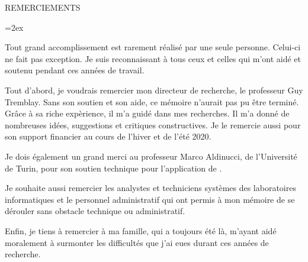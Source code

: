 
   \parskip=0pt
   \vspace*{0.1 truecm} 
   \begin{center}
    {\uppercase { REMERCIEMENTS }}\par
   \end{center}
   \nobreak \vspace*{1.10 truecm}
   \parskip=2ex




Tout grand accomplissement est rarement r\'ealis\'e par une seule personne. Celui-ci ne fait pas exception. Je suis reconnaissant \`a tous ceux et celles qui m'ont aid\'e et soutenu pendant ces ann\'ees de travail.

Tout d'abord, je voudrais remercier mon directeur de recherche, le professeur Guy Tremblay. Sans son soutien et son aide, ce m\'emoire n'aurait pas pu \^etre termin\'e. Gr\^ace \`a sa riche exp\`erience, il m'a guid\'e dans mes recherches. Il m'a donn\'e de nombreuses id\'ees, suggestions et critiques constructives.
%
Je le remercie aussi pour son support financier au cours de l'hiver et de l'été 2020.

Je dois \'egalement un grand merci au professeur Marco Aldinucci, de l'Universit\'e de Turin, pour son soutien technique pour l'application de . 

Je souhaite aussi remercier les analystes et techniciens syst\`emes des laboratoires informatiques et le personnel administratif qui ont permis \`a mon m\'emoire de se d\'erouler sans obstacle technique ou administratif.

Enfin, je tiens \`a remercier \`a ma famille, qui a toujours \'et\'e l\`a, m'ayant aid\'e moralement \`a surmonter les difficult\'es que j'ai eues durant ces ann\'ees de recherche. 


